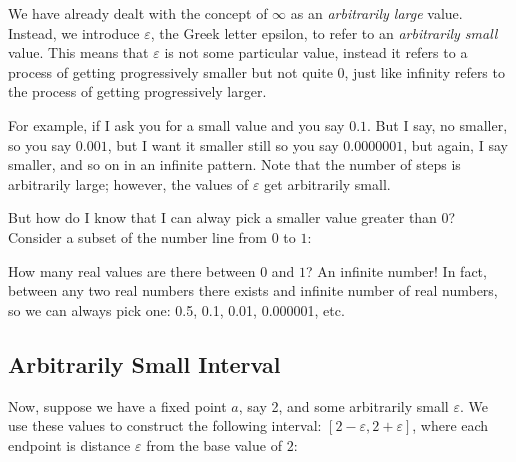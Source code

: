\documentclass[letterpaper,12pt,fleqn]{article}
\newcommand{\e}{\varepsilon}
\begin{document}
We have already dealt with the concept of \(\infty\) as an \emph{arbitrarily large} value.  Instead, we introduce
\(\e\), the Greek letter epsilon, to refer to an \emph{arbitrarily small} value.  This means that \(\e\) is not
some particular value, instead it refers to a process of getting progressively smaller but not quite \(0\), just
like infinity refers to the process of getting progressively larger.

For example, if I ask you for a small value and you say \(0.1\).  But I say, no smaller, so you say \(0.001\), but
I want it smaller still so you say \(0.0000001\), but again, I say smaller, and so on in an infinite pattern.  Note
that the number of steps is arbitrarily large; however, the values of \(\e\) get arbitrarily small.

But how do I know that I can alway pick a smaller value greater than \(0\)?  Consider a subset of the number line
from \(0\) to \(1\):

\bigskip


\bigskip

How many real values are there between \(0\) and \(1\)?  An infinite number!  In fact, between any two real numbers
there exists and infinite number of real numbers, so we can always pick one: 0.5, 0.1, 0.01, 0.000001, etc.

\bigskip


\subsection*{Arbitrarily Small Interval}

Now, suppose we have a fixed point \(a\), say 2, and some arbitrarily small \(\e\).  We use these values to
construct the following interval: \([2-\e,2+\e]\), where each endpoint is distance \(\e\) from the base value of
\(2\):
\end{document}
